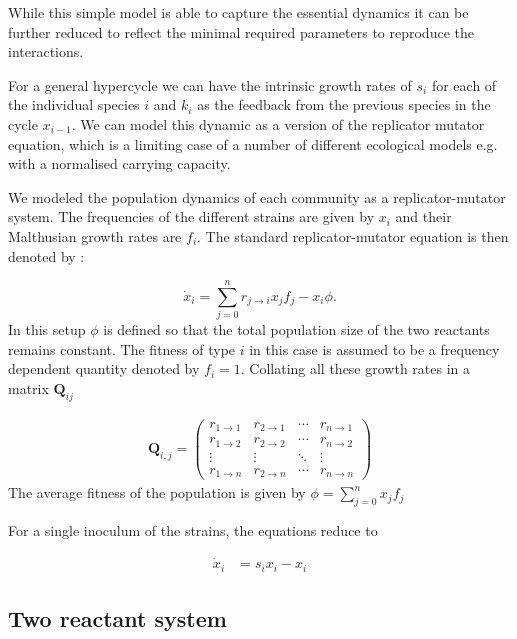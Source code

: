 While this simple model is able to capture the essential dynamics it can be further reduced to reflect the minimal required parameters to reproduce the interactions.

For a general hypercycle we can have the intrinsic growth rates of $s_i$ for each of the individual species $i$ and $k_i$ as the feedback from the previous species in the cycle $x_{i-1}$.
We can model this dynamic as a version of the replicator mutator equation, which is a limiting case of a number of different ecological models e.g. with a normalised carrying capacity.

We modeled the population dynamics of each community as a replicator-mutator system.
The frequencies of the different strains are given by $x_i$ and their Malthusian growth rates are $f_i$.
The standard replicator-mutator equation is then denoted by \citep{nowak:TREE:1992,nowak:book:2006}:

\begin{equation}
	\dot{x}_i = \sum_{j=0}^{n} r_{j \rightarrow i} x_j f_j - x_i \phi.
\end{equation}
In this setup $\phi$ is defined so that the total population size of the two reactants remains constant.
The fitness of type $i$ in this case is assumed to be a frequency dependent quantity denoted by $f_i = 1$. Collating all these growth rates in a matrix $\mathbf{Q}_{ij}$

\begin{align}
	\mathbf{Q}_{i,j} =
 \begin{pmatrix}
  r_{1 \rightarrow 1} & r_{2 \rightarrow 1} & \cdots & r_{n \rightarrow 1} \\
  r_{1 \rightarrow 2} & r_{2 \rightarrow 2} & \cdots & r_{n \rightarrow 2} \\
  \vdots  & \vdots  & \ddots & \vdots  \\
  r_{1 \rightarrow n} & r_{2 \rightarrow n} & \cdots & r_{n \rightarrow n} 
 \end{pmatrix}
\end{align}
The average fitness of the population is given by $\phi = \sum_{j=0}^{n} x_j f_j$

For a single inoculum of the strains, the equations reduce to

\begin{align}
	\dot{x}_i &=  s_i x_i - x_i
\end{align}

\subsection{Two reactant system}

